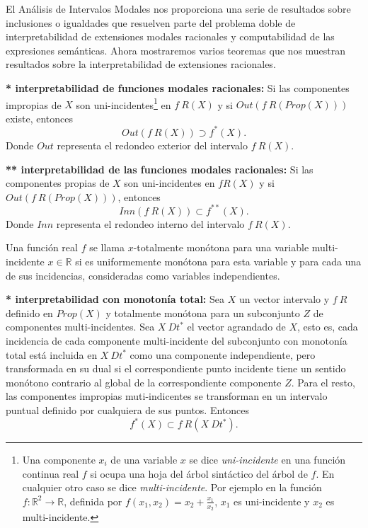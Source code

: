 El Análisis de Intervalos Modales nos proporciona una serie de resultados sobre inclusiones o igualdades que resuelven parte del problema doble de interpretabilidad de extensiones modales racionales y computabilidad de las expresiones semánticas. Ahora mostraremos varios teoremas que nos muestran resultados sobre la interpretabilidad de extensiones racionales.

\begin{theorem}{\textbf{* interpretabilidad de funciones modales racionales:}}\label{th1}
Si las componentes impropias de $X$ son uni-incidentes\footnote{Una componente $x_i$ de una variable $x$ se dice \textit{uni-incidente} en una función continua real $f$ si ocupa una hoja del árbol sintáctico del árbol de $f$. En cualquier otro caso se dice \textit{multi-incidente}. Por ejemplo en la función $f : \mathbb{R}^2 \to \mathbb{R}$, definida por $f(x_1,x_2) = x_2 + \frac{x_1}{x_2}$, $x_1$ es uni-incidente y $x_2$ es multi-incidente.} en $f \ R(X)$ y si $Out(f \ R(Prop(X)))$ existe, entonces
$$Out(f \ R(X)) \supset f^*(X).$$
Donde $Out$ representa el redondeo exterior del intervalo $f \ R(X)$.
\end{theorem}

\begin{theorem}{\textbf{** interpretabilidad de las funciones modales racionales:}}\label{th2}
Si las componentes propias de $X$ son uni-incidentes en $f R(X)$ y si $Out(f \ R(Prop(X)))$, entonces
$$Inn(f \ R(X)) \subset f^{**}(X).$$
Donde $Inn$ representa el redondeo interno del intervalo $f \ R(X)$.
\end{theorem}

Una función real $f$ se llama $x$-totalmente monótona para una variable multi-incidente $x \in \mathbb{R}$ si es uniformemente monótona para esta variable y para cada una de sus incidencias, consideradas como variables independientes.

\begin{theorem}{\textbf{* interpretabilidad con monotonía total:}}\label{th3}
Sea $X$ un vector intervalo y $f \ R$ definido en $Prop(X)$ y totalmente monótona para un subconjunto $Z$ de componentes multi-incidentes. Sea $X \ Dt^*$ el vector agrandado de $X$, esto es, cada incidencia de cada componente multi-incidente del subconjunto con monotonía total está incluida en $X \ Dt^*$ como una componente independiente, pero transformada en su dual si el correspondiente punto incidente tiene un sentido monótono contrario al global de la correspondiente componente $Z$. Para el resto, las componentes impropias muti-indicentes se transforman en un intervalo puntual definido por cualquiera de sus puntos. Entonces
$$f^*(X) \subset f \ R(X \ Dt^*).$$
\end{theorem}

